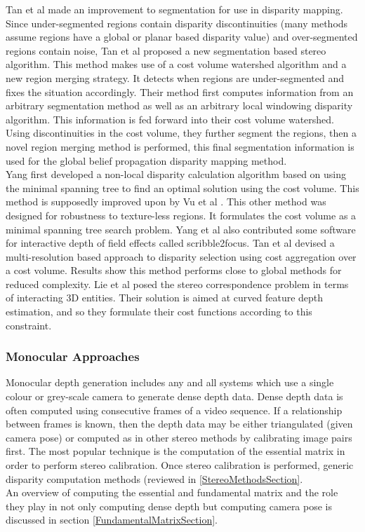 Tan et al \cite{Tan14Stereo} made an improvement to segmentation for use in disparity mapping. Since under-segmented regions contain disparity discontinuities (many methods assume regions have a global or planar based disparity value) and over-segmented regions contain noise, Tan et al proposed a new segmentation based stereo algorithm. This method makes use of a cost volume watershed algorithm and a new region merging strategy. It detects when regions are under-segmented and fixes the situation accordingly. Their method first computes information from an arbitrary segmentation method as well as an arbitrary local windowing disparity algorithm. This information is fed forward into their cost volume watershed. Using discontinuities in the cost volume, they further segment the regions, then a novel region merging method is performed, this final segmentation information is used for the global belief propagation disparity mapping method. \\


Yang \cite{Yang14Pattern} first developed a non-local disparity calculation algorithm based on using the minimal spanning tree to find an optimal solution using the cost volume. This method is supposedly improved upon by Vu et al \cite{Vu14Efficient}. This other method was designed for robustness to texture-less regions. It formulates the cost volume as a minimal spanning tree search problem. Yang et al also contributed some software for interactive depth of field effects called scribble2focus. Tan et al \cite{Tan14Soft} devised a multi-resolution based approach to disparity selection using cost aggregation over a cost volume. Results show this method performs close to global methods for reduced complexity. Lie et al \cite{Liu143d} posed the stereo correspondence problem in terms of interacting 3D entities. Their solution is aimed at curved feature depth estimation, and so they formulate their cost functions according to this constraint. \\



\subsubsection{Monocular Approaches}

Monocular depth generation includes any and all systems which use a single colour or grey-scale camera to generate dense depth data. Dense depth data is often computed using consecutive frames of a video sequence. If a relationship between frames is known, then the depth data may be either triangulated (given camera pose) or computed as in other stereo methods by calibrating image pairs first. The most popular technique is the computation of the essential matrix in order to perform stereo calibration. Once stereo calibration is performed, generic disparity computation methods (reviewed in \ref{StereoMethodsSection}. \\

An overview of computing the essential and fundamental matrix and the role they play in not only computing dense depth but computing camera pose is discussed in section \ref{FundamentalMatrixSection}. 

